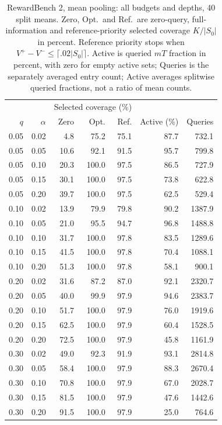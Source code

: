 \begin{table}[t]
\centering\small
\begin{tabular}{rrrrrrr}
\toprule
 & & \multicolumn{3}{c}{Selected coverage (\%)} & & \\
$q$ & $\alpha$ & Zero & Opt. & Ref. & Active (\%) & Queries \\
\midrule
0.05 & 0.02 & 4.8 & 75.2 & 75.1 & 87.7 & 732.1 \\
0.05 & 0.05 & 10.6 & 92.1 & 91.5 & 95.7 & 799.8 \\
0.05 & 0.10 & 20.3 & 100.0 & 97.5 & 86.5 & 727.9 \\
0.05 & 0.15 & 30.1 & 100.0 & 97.5 & 73.8 & 622.8 \\
0.05 & 0.20 & 39.7 & 100.0 & 97.5 & 62.5 & 529.4 \\
0.10 & 0.02 & 13.9 & 79.9 & 79.8 & 90.2 & 1387.9 \\
0.10 & 0.05 & 21.0 & 95.5 & 94.7 & 96.8 & 1488.8 \\
0.10 & 0.10 & 31.7 & 100.0 & 97.8 & 83.5 & 1289.6 \\
0.10 & 0.15 & 41.5 & 100.0 & 97.8 & 70.4 & 1088.1 \\
0.10 & 0.20 & 51.3 & 100.0 & 97.8 & 58.1 & 900.1 \\
0.20 & 0.02 & 31.6 & 87.2 & 87.0 & 92.1 & 2320.7 \\
0.20 & 0.05 & 40.0 & 99.9 & 97.9 & 94.6 & 2383.7 \\
0.20 & 0.10 & 51.7 & 100.0 & 97.9 & 76.0 & 1919.6 \\
0.20 & 0.15 & 62.5 & 100.0 & 97.9 & 60.4 & 1528.5 \\
0.20 & 0.20 & 72.5 & 100.0 & 97.9 & 45.8 & 1161.9 \\
0.30 & 0.02 & 49.0 & 92.3 & 91.9 & 93.1 & 2814.8 \\
0.30 & 0.05 & 58.4 & 100.0 & 97.9 & 88.3 & 2670.4 \\
0.30 & 0.10 & 70.8 & 100.0 & 97.9 & 67.0 & 2028.7 \\
0.30 & 0.15 & 81.5 & 100.0 & 97.9 & 47.6 & 1442.6 \\
0.30 & 0.20 & 91.5 & 100.0 & 97.9 & 25.0 & 764.6 \\
\bottomrule
\end{tabular}
\caption{RewardBench 2, mean pooling: all budgets and depths, 40 split means. Zero, Opt.\ and Ref.\ are zero-query, full-information and reference-priority selected coverage $K/|S_0|$ in percent. Reference priority stops when $V^+-V^-\le\lceil.02|S_0|\rceil$. Active is queried $mT$ fraction in percent, with zero for empty active sets; Queries is the separately averaged entry count; Active averages splitwise queried fractions, not a ratio of mean counts.}
\label{tab:review-budget-0-mean}
\end{table}
